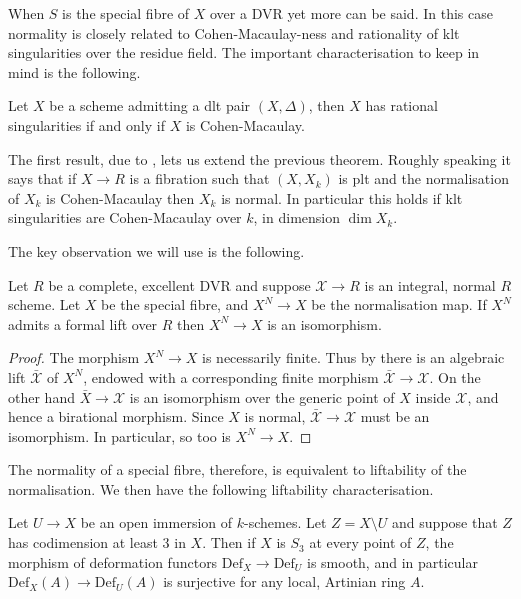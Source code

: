 When $S$ is the special fibre of $X$ over a DVR yet more can be said. In this case normality is closely related to Cohen-Macaulay-ness and rationality of klt singularities over the residue field. The important characterisation to keep in mind is the following.

\begin{theorem}
	Let $X$ be a scheme admitting a dlt pair $(X,\Delta)$, then $X$ has rational singularities if and only if $X$ is Cohen-Macaulay.
\end{theorem}

The first result, due to \cite{hacon2020relative}, lets us extend the previous theorem. Roughly speaking it says that if $X \to R$ is a fibration such that $(X,X_{k})$ is plt and the normalisation of $X_{k}$ is Cohen-Macaulay then $X_{k}$ is normal. In particular this holds if klt singularities are Cohen-Macaulay over $k$, in dimension $\dim X_{k}$.

The key observation we will use is the following.

\begin{lemma} \label{lift-lemma-1}
	
	Let $R$ be a complete, excellent DVR and suppose $\mathcal{X} \to R$ is an integral, normal $R$ scheme. Let $X$ be the special fibre, and $X^{N} \to X$ be the normalisation map. If $X^{N}$ admits a formal lift over $R$ then $X^{N} \to X$ is an isomorphism.
	
	\end{lemma}

\begin{proof}
	The morphism $X^{N} \to X$ is necessarily finite. Thus by \cite[Tag 09ZT]{stacks-project} there is an algebraic lift $\bar{\mathcal{X}}$ of $X^{N}$, endowed with a corresponding finite morphism $\bar{\mathcal{X}} \to \mathcal{X}$. On the other hand $\bar{X} \to \mathcal{X}$ is an isomorphism over the generic point of $X$ inside $\mathcal{X}$, and hence a birational morphism. Since $X$ is normal, $\bar{\mathcal{X}}\to \mathcal{X}$ must be an isomorphism. In particular, so too is $X^{N} \to X$.
\end{proof}

The normality of a special fibre, therefore, is equivalent to liftability of the normalisation. We then have the following liftability characterisation.

\begin{lemma}\cite[Lemma A.23]{zdanowicz2018liftability}\label{lift-lemma-2}
	
	Let $U \to X$ be an open immersion of $k$-schemes. Let $Z=X \setminus U$ and suppose that $Z$ has codimension at least $3$ in $X$. Then if $X$ is $S_{3}$ at every point of $Z$, the morphism of deformation functors $\text{Def}_{X} \to \text{Def}_{U}$ is smooth, and in particular $\text{Def}_{X}(A) \to \text{Def}_{U}(A)$ is surjective for any local, Artinian ring $A$.  
	
	\end{lemma}

